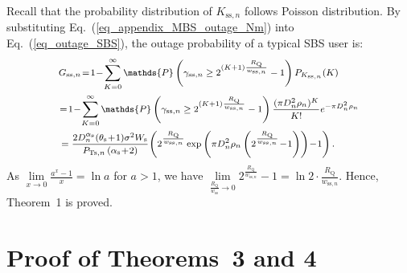 \documentclass[12pt, draftclsnofoot,onecolumn]{IEEEtran}
\begin{document}
    Recall that the probability distribution of $K_{\mathrm{ss},n}$ follows Poisson distribution.
    By substituting Eq.~(\ref{eq_appendix_MBS_outage_Nm}) into Eq.~(\ref{eq_outage_SBS}), the outage probability of a typical SBS user is:
        \begin{equation} \footnotesize
            \begin{split}
                & G_{\mathrm{ss},n} \!=\! 1\! -\! \sum_{K=0}^\infty \mathds{P} \left( \gamma_{\mathrm{ss},n} \geq 2^{(K+1) \frac{R_\mathrm{Q}}{w_{\mathrm{ss},n}}} -1 \right) P_{K_{\mathrm{ss},n}}(K) \\
                &\!=\! 1\!-\!\sum_{K=0}^\infty \mathds{P} \left( \gamma_{\mathrm{ss},n} \geq 2^{(K+1) \frac{R_\mathrm{Q}}{w_{\mathrm{ss},n}}} -1 \right) \frac{(\pi D_{n}^2 \rho_{n})^K}{K!}e^{- \pi D_{n}^2 \rho_{n}} \\
                &= \frac{2 D_{n}^{\alpha_\mathrm{s}} (\theta_\mathrm{s}\!+\!1)\sigma^2 W_\mathrm{s} }{P_{\mathrm{Ts},n} \left(\alpha_\mathrm{s}\!+\!2\right) } \! \left( 2^{\frac{R_\mathrm{Q}}{w_{\mathrm{ss},n}}}\exp\left(\pi D_{n}^2 \rho_{n} \left( 2^{\frac{R_\mathrm{Q}}{w_{\mathrm{ss},n}}} \!-\! 1 \right)\right)\!-\!1\right).
            \end{split}
        \end{equation}
    As $\lim\limits_{x\rightarrow0} \frac{a^x-1}{x} = \ln a$ for $a>1$, we have $\lim\limits_{\frac{R_\mathrm{Q}}{w_{\mathrm{ss}}} \rightarrow 0} 2^{\frac{R_\mathrm{Q}}{w_{\mathrm{ss},n}}}-1 = \ln2 \cdot \frac{R_\mathrm{Q}}{w_{\mathrm{ss},n}}$.
    Hence, Theorem~1 is proved.

\section{Proof of Theorems~3 and 4}
\label{appendix_HSBS}
\end{document}
